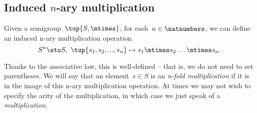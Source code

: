 \subsection{Induced $n$-ary multiplication}
Given a semigroup~$\tup{S, \mtimes}$, for each~$n \in \natnumbers$, we can define an induced n-ary multiplication operation
\begin{equation*}
  S^n \sto S, \ \tup{s_1, s_2, ..., s_n} \mapsto s_1 \mtimes s_2 \dots \mtimes s_n.
\end{equation*}


Thanks to the associative law, this is well-defined -- that is, we do not need to set parentheses.
We will say that an element~$s \in S$ is an \emph{n-fold multiplication} if it is in the image of this n-ary multiplication operation.
At times we may not wish to specify the arity of the multiplication, in which case we just speak of a \emph{multiplication}.
